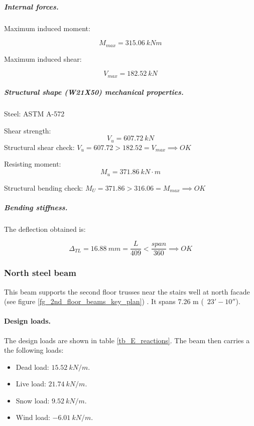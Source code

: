 \subparagraph{Internal forces.}

\noindent Maximum induced moment:

\begin{equation}
  M_{max}= 315.06\ kN m
\end{equation}

\noindent Maximum induced shear:

\begin{equation}
  V_{max}= 182.52\ kN
\end{equation}

\subparagraph{Structural shape (W21X50) mechanical properties.}
Steel: ASTM A-572

\noindent Shear strength:
\begin{equation}
  V_u= 607.72\ kN 
\end{equation}
\noindent Structural shear check: $V_u = 607.72 > 182.52 = V_{max} \implies OK$

\noindent Resisting moment:
\begin{equation}
  M_u= 371.86\ kN\cdot m
\end{equation}

\noindent Structural bending check: $M_U = 371.86 > 316.06 = M_{max} \implies OK$

\subparagraph{Bending stiffness.}
The deflection obtained is:

\begin{equation}
  \Delta_{TL}=16.88\ mm= \frac{L}{409} < \frac{span}{360} \implies OK
\end{equation}

\subsubsection{North steel beam}
This beam supports the second floor trusses near the stairs well at north facade (see figure \ref{fg_2nd_floor_beams_key_plan}) . It spans 7.26 m (~$23' - 10''$).

\paragraph{Design loads.}
The design loads are shown in table \ref{tb_E_reactions}.  The beam then carries a the following loads:\\
\begin{itemize}
\item Dead load: $15.52\ kN/m$.
\item Live load: $21.74\ kN/m$.
\item Snow load: $9.52\ kN/m$.
\item Wind load: $-6.01\ kN/m$.
\end{itemize}

